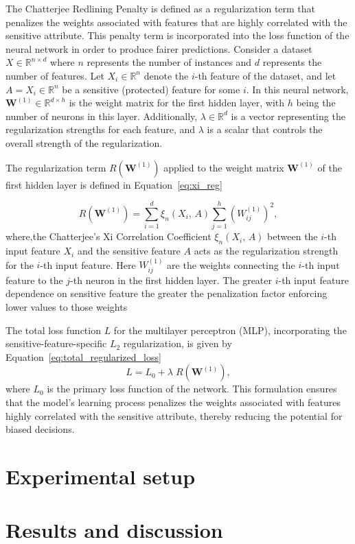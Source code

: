 The Chatterjee Redlining Penalty is defined as a regularization term that penalizes the weights associated with features that are highly correlated with the sensitive attribute. This penalty term is incorporated into the loss function of the neural network in order to produce fairer predictions. Consider a dataset \(X \in \mathbb{R}^{n \times d}\) where \(n\) represents the number of instances and \(d\) represents the number of features. Let \(X_i \in \mathbb{R}^n\) denote the \(i\)-th feature of the dataset, and let \(A = X_i \in \mathbb{R}^n\) be a sensitive (protected) feature for some \(i\). In this neural network, \(\mathbf{W}^{(1)} \in \mathbb{R}^{d \times h}\) is the weight matrix for the first hidden layer, with \(h\) being the number of neurons in this layer. Additionally, \(\lambda \in \mathbb{R}^d\) is a vector representing the regularization strengths for each feature, and $\lambda$ is a scalar that controls the overall strength of the regularization.

The regularization term \(R(\mathbf{W}^{(1)})\) applied to the weight matrix \(\mathbf{W}^{(1)}\) of the first hidden layer is defined in Equation~\ref{eq:xi_reg}

\begin{equation}\label{eq:xi_reg}
R(\mathbf{W}^{(1)}) = \sum_{i=1}^d \xi_n(X_i,\,A) \sum_{j=1}^h (W^{(1)}_{ij})^2,
\end{equation}
where,the Chatterjee's Xi Correlation Coefficient  $\xi_n(X_i,\,A)$  between the $i$-th input feature $X_i$ and the sensitive feature $A$ acts as the regularization strength for the $i$-th input feature. Here $W^{(1)}_{ij}$ are the weights connecting the $i$-th input feature to the $j$-th neuron in the first hidden layer. The greater $i$-th input feature dependence on sensitive feature the greater the penalization factor enforcing lower values to those weights

The total loss function \(L\) for the multilayer perceptron (MLP), incorporating the sensitive-feature-specific \(L_2\) regularization, is given by Equation~\ref{eq:total_regularized_loss}
\begin{equation}\label{eq:total_regularized_loss}
L = L_0 + \lambda \; R(\mathbf{W}^{(1)}),
\end{equation}
where $L_0$ is the primary loss function of the network. This formulation ensures that the model's learning process penalizes the weights associated with features highly correlated with the sensitive attribute, thereby reducing the potential for biased decisions.


\section{Experimental setup}

\section{Results and discussion}
